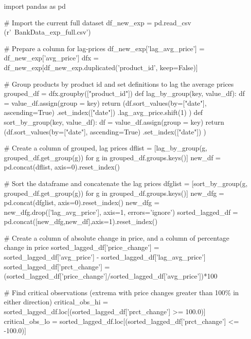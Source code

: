 \begin{python}
import pandas as pd

# Import the current full dataset
df_new_exp = pd.read_csv (r'~\World Bank\Data\Walmart Data\walmart_exp_full.csv')

# Prepare a column for lag-prices
df_new_exp['lag_avg_price'] = df_new_exp['avg_price']
dfx = df_new_exp[df_new_exp.duplicated('product_id', keep=False)]

# Group products by product id and set definitions to lag the average prices
grouped_df = dfx.groupby(["product_id"])
def lag_by_group(key, value_df):
    df = value_df.assign(group = key) 
    return (df.sort_values(by=["date"], ascending=True)
        .set_index(["date"])
        .lag_avg_price.shift(1)
               )
def sort_by_group(key, value_df):
    df = value_df.assign(group = key)
    return (df.sort_values(by=["date"], ascending=True)
        .set_index(["date"])
               )
               
# Create a column of grouped, lag prices
dflist = [lag_by_group(g, grouped_df.get_group(g)) for g in grouped_df.groups.keys()]
new_df = pd.concat(dflist, axis=0).reset_index()

# Sort the dataframe and concatenate the lag prices
dfglist = [sort_by_group(g, grouped_df.get_group(g)) for g in grouped_df.groups.keys()]
new_dfg = pd.concat(dfglist, axis=0).reset_index()
new_dfg = new_dfg.drop(['lag_avg_price'], axis=1, errors='ignore')
sorted_lagged_df = pd.concat([new_dfg,new_df],axis=1).reset_index()

# Create a column of absolute change in price, and a column of percentage change in price
sorted_lagged_df['price_change'] = sorted_lagged_df['avg_price'] - sorted_lagged_df['lag_avg_price']
sorted_lagged_df['prct_change'] = (sorted_lagged_df['price_change']/sorted_lagged_df['avg_price'])*100

# Find critical observations (extrema with price changes greater than 100\% in either direction)
critical_obs_hi = sorted_lagged_df.loc[(sorted_lagged_df['prct_change'] >= 100.0)]
critical_obs_lo = sorted_lagged_df.loc[(sorted_lagged_df['prct_change'] <= -100.0)]
\end{python}



